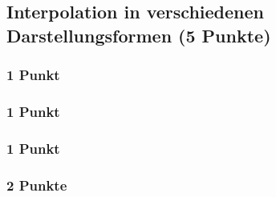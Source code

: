 \newif\ifvimbug
\vimbugfalse

\ifvimbug

\fi


\subsection{Interpolation in verschiedenen Darstellungsformen (5 Punkte)}
\subsubsection{1 Punkt}

\subsubsection{1 Punkt}

\subsubsection{1 Punkt}

\subsubsection{2 Punkte}